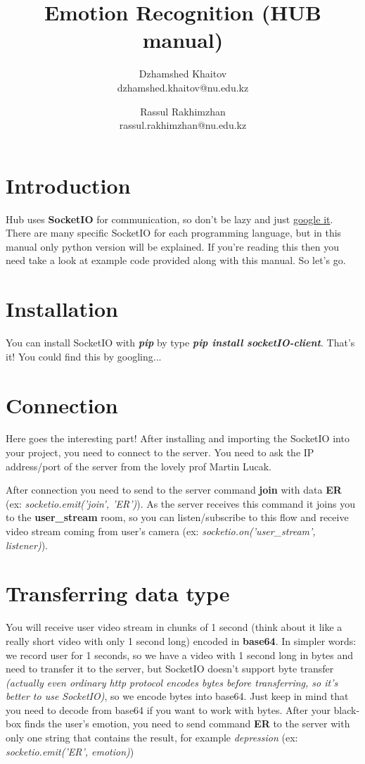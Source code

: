 \documentclass[10pt]{article}
\title {
	Emotion Recognition (HUB manual)
}
\date {}
\author {
	Dzhamshed Khaitov\\
	dzhamshed.khaitov@nu.edu.kz
	\and
	Rassul Rakhimzhan\\
	rassul.rakhimzhan@nu.edu.kz
}
\begin{document}
		
\maketitle

\section{Introduction}

Hub uses \textbf{SocketIO} for communication, so don't be lazy and just \href{http://www.justfuckinggoogleit.com/search/socketio}{google it}. There are many specific SocketIO for each programming language, but in this manual only python version will be explained. If you're reading this then you need take a look at example code provided along with this manual. So let's go.

\section{Installation}
You can install SocketIO with \textbf{\textit{pip}} by type \textbf{\textit{pip install socketIO-client}}. That's it! You could find this by googling...

\section{Connection}
Here goes the interesting part! After installing and importing the SocketIO into your project, you need to connect to the server. You need to ask the IP address/port of the server from the lovely prof Martin Lucak.
\par
After connection you need to send to the server command \textbf{join} with data \textbf{ER} (ex: \textit{socketio.emit('join', 'ER')}). As the server receives this command it joins you to the \textbf{user\_stream} room, so you can listen/subscribe to this flow and receive video stream coming from user's camera (ex: \textit{socketio.on('user\_stream', listener)}).

\section{Transferring data type}
You will receive user video stream in chunks of 1 second (think about it like a really short video with only 1 second long) encoded in \textbf{base64}. In simpler words: we record user for 1 seconds, so we have a video with 1 second long in bytes and need to transfer it to the server, but SocketIO doesn't support byte transfer \textit{(actually even ordinary http protocol encodes bytes before transferring, so it's better to use SocketIO)}, so we encode bytes into base64. Just keep in mind that you need to decode from base64 if you want to work with bytes.
After your black-box finds the user's emotion, you need to send command \textbf{ER} to the server with only one string that contains the result, for example \textit{depression} (ex: \textit{socketio.emit('ER', emotion)})
\end{document}
